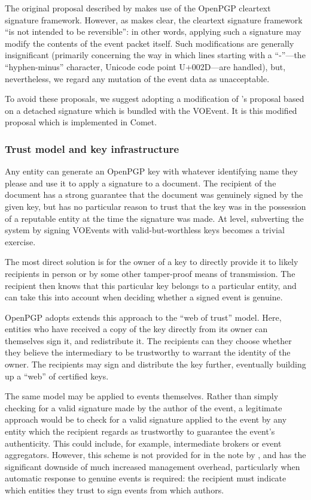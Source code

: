 \documentclass[5p,authoryear]{elsarticle}
\begin{document}
The original proposal described by \citet{Denny:2008} makes use of the OpenPGP
cleartext signature framework. However, as \citet[\S7]{Callas:2007} makes clear, the
cleartext signature framework ``is not intended to be reversible'': in other
words, applying such a signature may modify the contents of the event packet
itself. Such modifications are generally insignificant (primarily concerning
the way in which lines starting with a ``-''---the ``hyphen-minus'' character,
Unicode code point U+002D---are handled), but, nevertheless, we regard any
mutation of the event data as unacceptable.

To avoid these proposals, we suggest adopting a modification of
\citeauthor{Denny:2008}'s proposal based on a detached signature
\citep[\S11.4]{Callas:2007} which is bundled with the VOEvent. It is this
modified proposal which is implemented in Comet.

\subsubsection{Trust model and key infrastructure}

Any entity can generate an OpenPGP key with whatever identifying name they
please and use it to apply a signature to a document. The recipient of the
document has a strong guarantee that the document was genuinely signed by the
given key, but has no particular reason to trust that the key was in the
possession of a reputable entity at the time the signature was made. At level,
subverting the system by signing VOEvents with valid-but-worthless keys
becomes a trivial exercise.

The most direct solution is for the owner of a key to directly provide it to
likely recipients in person or by some other tamper-proof means of
transmission. The recipient then knows that this particular key belongs to a
particular entity, and can take this into account when deciding whether a
signed event is genuine.

OpenPGP adopts extends this approach to the ``web of trust'' model. Here,
entities who have received a copy of the key directly from its owner can
themselves sign it, and redistribute it. The recipients can they choose
whether they believe the intermediary to be trustworthy to warrant the identity
of the owner. The recipients may sign and distribute the key further,
eventually building up a ``web'' of certified keys.

The same model may be applied to events themselves. Rather than simply
checking for a valid signature made by the author of the event, a legitimate
approach would be to check for a valid signature applied to the event by any
entity which the recipient regards as trustworthy to guarantee the event's
authenticity. This could include, for example, intermediate brokers or event
aggregators. However, this scheme is not provided for in the note by
\citeauthor{Denny:2008}, and has the significant downside of much increased
management overhead, particularly when automatic response to genuine events is
required: the recipient must indicate which entities they trust to sign events
from which authors.
\end{document}
